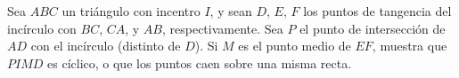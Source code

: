Sea $ABC$ un triángulo con incentro $I$, y sean $D$, $E$, $F$ los puntos de tangencia del incírculo con $BC$, $CA$, y $AB$, respectivamente. Sea $P$ el punto de intersección de $AD$ con el incírculo (distinto de $D$). Si $M$ es el punto medio de $EF$, muestra que $PIMD$ es cíclico, o que los puntos caen sobre una misma recta.